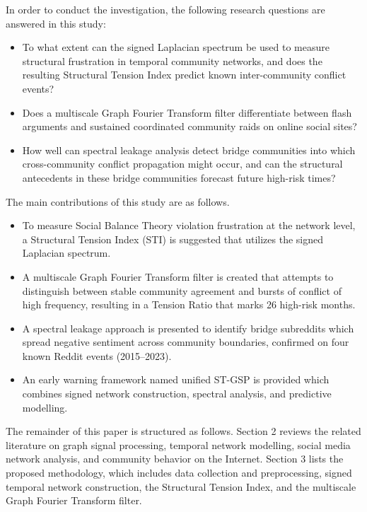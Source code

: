 \documentclass[a4paper,fleqn]{cas-dc}
\begin{document}
In order to conduct the investigation, the following research questions are answered in this study:

\begin{itemize}
\item To what extent can the signed Laplacian spectrum be used to measure structural frustration in temporal community networks, and does the resulting Structural Tension Index predict known inter-community conflict events?
\item Does a multiscale Graph Fourier Transform filter differentiate between flash arguments and sustained coordinated community raids on online social sites?
\item How well can spectral leakage analysis detect bridge communities into which cross-community conflict propagation might occur, and can the structural antecedents in these bridge communities forecast future high-risk times?
\end{itemize}

The main contributions of this study are as follows.

\begin{itemize}
\item To measure Social Balance Theory violation frustration at the network level, a Structural Tension Index (STI) is suggested that utilizes the signed Laplacian spectrum.
\item A multiscale Graph Fourier Transform filter is created that attempts to distinguish between stable community agreement and bursts of conflict of high frequency, resulting in a Tension Ratio that marks 26 high-risk months.
\item A spectral leakage approach is presented to identify bridge subreddits which spread negative sentiment across community boundaries, confirmed on four known Reddit events (2015--2023).
\item An early warning framework named unified ST-GSP is provided which combines signed network construction, spectral analysis, and predictive modelling.
\end{itemize}

The remainder of this paper is structured as follows. Section 2 reviews the related literature on graph signal processing, temporal network modelling, social media network analysis, and community behavior on the Internet. Section 3 lists the proposed methodology, which includes data collection and preprocessing, signed temporal network construction, the Structural Tension Index, and the multiscale Graph Fourier Transform filter.
\end{document}
